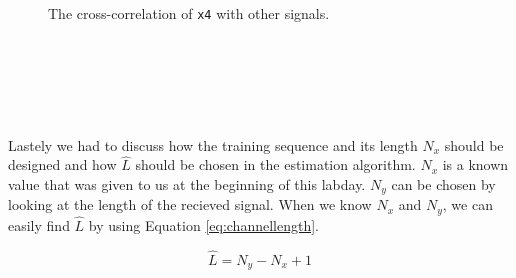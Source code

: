 \documentclass[final]{scrreprt} %
\begin{document}
\begin{figure}[H]
	\centering
    	\setlength\figureheight{6cm}
    	\setlength\figurewidth{10cm}
    	    	
    	\caption{The cross-correlation of \texttt{x4} with other signals.}
    	\label{fig:cross4}
\end{figure}
\\
\\
\\
\\
\\
Lastely we had to discuss how the training  sequence and its length $N_x$ should be designed and how $\hat{L}$ should be chosen in the estimation algorithm.
$N_x$ is a known value that was given to us at the beginning of this labday. 
$N_y$ can be chosen by looking at the length of the recieved signal.
When we know $N_x$ and $N_y$, we can easily find $\hat{L}$ by using Equation \ref{eq:channellength}.

\begin{equation}
\hat{L}=N_y - N_x +1
\label{eq:channellength}
\end{equation}
\end{document}

